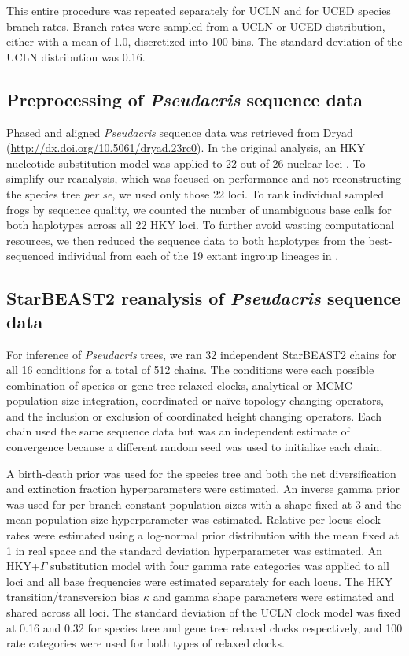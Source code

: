 \documentclass[nogrid]{MBE}%
\begin{document}
This entire procedure was repeated separately for UCLN and for UCED species
branch rates. Branch rates were sampled from a UCLN or UCED distribution, either
with a mean of 1.0, discretized into 100 bins. The standard deviation of the
UCLN distribution was 0.16.

\subsection{Preprocessing of \textit{Pseudacris} sequence data}

Phased and aligned \textit{Pseudacris} sequence data was retrieved from Dryad
(\url{http://dx.doi.org/10.5061/dryad.23rc0}). In the original analysis, an HKY nucleotide substitution
model was applied to 22 out of 26 nuclear loci \citep{Barrow201478}. To simplify
our reanalysis, which was focused on performance and not reconstructing the
species tree \textit{per se}, we used only those 22 loci. To rank
individual sampled frogs by sequence quality, we counted the number of unambiguous base
calls for both haplotypes across all 22 HKY loci. To further avoid wasting
computational resources, we then reduced the sequence data to both haplotypes
from the best-sequenced individual from each of the 19 extant ingroup lineages
in \cite{Barrow201478}.

\subsection{StarBEAST2 reanalysis of \textit{Pseudacris} sequence data}

For inference of \textit{Pseudacris} trees, we ran 32 independent StarBEAST2
chains for all 16 conditions for a total of 512 chains. The conditions were each
possible combination of species or gene tree relaxed clocks, analytical or
MCMC population size integration, coordinated or na\"ive topology changing
operators, and the inclusion or exclusion of coordinated height changing
operators. Each chain used the same sequence data but was an independent
estimate of convergence because a different random seed was used to initialize
each chain.

A birth-death prior was used for the species tree and both the net
diversification and extinction fraction hyperparameters were estimated. An
inverse gamma prior was used for per-branch constant population sizes with a
shape fixed at 3 and the mean population size hyperparameter was estimated.
Relative per-locus clock rates were estimated using a log-normal prior
distribution with the mean fixed at 1 in real space and the standard deviation
hyperparameter was estimated. An HKY+$\Gamma$ substitution model with four gamma
rate categories was applied to all loci and all base frequencies were estimated
separately for each locus. The HKY transition/transversion bias $\kappa$ and
gamma shape parameters were estimated and shared across all loci. The standard
deviation of the UCLN clock model was fixed at 0.16 and 0.32 for species tree
and gene tree relaxed clocks respectively, and 100 rate categories were used for
both types of relaxed clocks.
\end{document}

